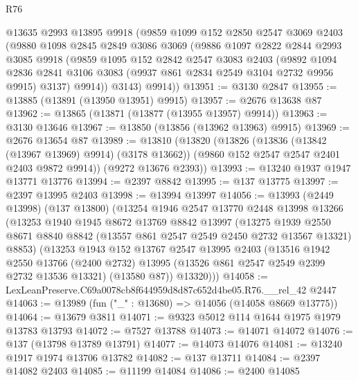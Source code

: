 \begin{lexlean}{R76}
\begin{coremodule}
      @13635
      @2993
      @13895
      @9918
      (@9859
        @1099
        @152
        @2850
        @2547
        @3069
        @2403
        (@9880
          @1098
          @2845
          @2849
          @3086
          @3069
          (@9886
            @1097
            @2822
            @2844
            @2993
            @3085
            @9918
            (@9859
              @1095
              @152
              @2842
              @2547
              @3083
              @2403
              (@9892
                @1094
                @2836
                @2841
                @3106
                @3083
                (@9937 @861 @2834 @2549 @3104 @2732 @9956 @9915)
                @3137)
              @9914))
          @3143)
        @9914))
@13951 := @3130 @2847
@13955 := @13885 (@13891 (@13950 @13951) @9915)
@13957 := @2676 @13638 @87
@13962 := @13865 (@13871 (@13877 (@13955 @13957) @9914))
@13963 := @3130 @13646
@13967 := @13850 (@13856 (@13962 @13963) @9915)
@13969 := @2676 @13654 @87
@13989 := @13810
    (@13820
      (@13826
        (@13836 (@13842 (@13967 @13969) @9914) (@3178 @13662))
        (@9860 @152 @2547 @2547 @2401 @2403 @9872 @9914))
      (@9272 @13676 @2393))
@13993 := @13240 @1937 @1947 @13771 @13776
@13994 := @2397 @8842
@13995 := @137 @13775
@13997 := @2397 @13995 @2403
@13998 := @13994 @13997
@14056 := @13993
    (@2449 @13998)
    (@137 @13800)
    (@13254
      @1946
      @2547
      @13770
      @2448
      @13998
      @13266
      (@13253
        @1940
        @1945
        @8672
        @13769
        @8842
        @13997
        (@13275
          @1939
          @2550
          @8671
          @8840
          @8842
          (@13557 @861 @2547 @2549 @2450 @2732 @13567 @13321)
          @8853)
        (@13253
          @1943
          @152
          @13767
          @2547
          @13995
          @2403
          (@13516
            @1942
            @2550
            @13766
            (@2400 @2732)
            @13995
            (@13526 @861 @2547 @2549 @2399 @2732 @13536 @13321)
            (@13580 @87))
          @13320)))
@14058 := LexLeanPreserve.C69a0078cb8f644959d8d87c652d4be05.R76.__rel_42 @2447
@14063 := @13989 (fun ("_" : @13680) => @14056 (@14058 @8669 @13775))
@14064 := @13679 @3811
@14071 := @9323 @5012 @114 @1644 @1975 @1979 @13783 @13793
@14072 := @7527 @13788
@14073 := @14071 @14072
@14076 := @137 (@13798 @13789 @13791)
@14077 := @14073 @14076
@14081 := @13240 @1917 @1974 @13706 @13782
@14082 := @137 @13711
@14084 := @2397 @14082 @2403
@14085 := @11199 @14084
@14086 := @2400 @14085

\end{coremodule}
\end{lexlean}
